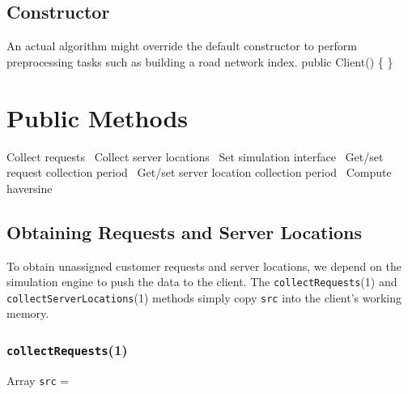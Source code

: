 \documentclass{article}
\def\nwendcode{\endtrivlist \endgroup}      %
\let\nwdocspar=\par
\begin{document}
\subsection{Constructor}
An actual algorithm might override the default constructor to perform
preprocessing tasks such as building a road network index.
\nwenddocs{}\endmoddef{}
public Client() \{ \}
\nwendcode{}\nwdocspar

\section{Public Methods}
\nwenddocs{}\endmoddef{}
  \LA{}Collect requests~{\nwtagstyle{}}\RA{}
  \LA{}Collect server locations~{\nwtagstyle{}}\RA{}
  \LA{}Set simulation interface~{\nwtagstyle{}}\RA{}
  \LA{}Get/set request collection period~{\nwtagstyle{}}\RA{}
  \LA{}Get/set server location collection period~{\nwtagstyle{}}\RA{}
  \LA{}Compute haversine~{\nwtagstyle{}}\RA{}
\nwendcode{}\nwdocspar

\subsection{Obtaining Requests and Server Locations}
To obtain unassigned customer requests and server locations, we depend on
the simulation engine to push the data to the client. The {\tt{}\protect{}\protect{}collectRequests}(1)
and {\tt{}\protect{}collectServerLocations}(1) methods simply copy {\tt{}src} into
the client's working memory.

\subsubsection{{\tt{}\protect{}collectRequests}(1)}
Array {\tt{}src} =
\end{document}
